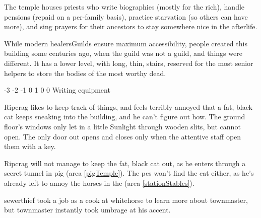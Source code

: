 \begin{multicols}{2}
\townmaster


The temple houses priests who write biographies (mostly for the rich), handle pensions (repaid on a per-family basis), practice starvation (so others can have more), and sing prayers for their ancestors to stay somewhere nice in the afterlife.

While modern \glspl{healersGuild} ensure maximum accessibility, people created this building some centuries ago, when the guild was not a guild, and things were different.
It has a lower level, with long, thin, stairs, reserved for the most senior \glspl{helper} to store the bodies of the most worthy dead.

{-3}%
{-2}%
{{-1}%
{0}%
{1}}%
{0}%
{0}%
{}%
{Writing equipment}%
{
  \setcounter{Academics}{1}
  \setcounter{Empathy}{2}
  \setcounter{Medicine}{2}
  \addtocounter{fp}{5}
}


Ripcrag likes to keep track of things, and feels terribly annoyed that a fat, black cat keeps sneaking into the building, and he can't figure out how.
The ground floor's windows only let in a little Sunlight through wooden slits, but cannot open.
The only door out opens and closes only when the attentive staff open them with a key.

Ripcrag will not manage to keep the fat, black cat out, as he enters through a secret tunnel in \gls{pig} (area \vref{pigTemple}).
The \glspl{pc} won't find the cat either, as he's already left to annoy the horses in the  (area \vref{stationStables}).


\begin{exampletext}
  \Gls{sewerthief} took a job as a cook at \gls{whitehorse} to learn more about \gls{townmaster}, but \gls{townmaster} instantly took umbrage at his  accent.
\end{exampletext}


\end{multicols}
